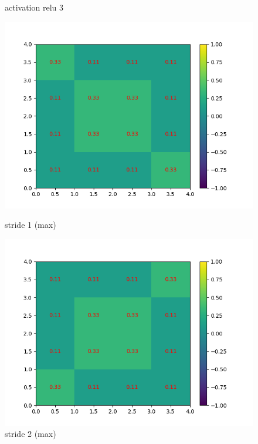 \begin{figure}[h]
        \caption{activation relu 3}
    \endminipage
\end{figure}

\begin{figure}[h]
        \includegraphics[width=\textwidth]{img/cnn_exemple/square/stride_1_max.png}
        \caption{stride 1 (max)}
    \endminipage\hfill
        \includegraphics[width=\textwidth]{img/cnn_exemple/square/stride_2_max.png}
        \caption{stride 2 (max)}
    \endminipage\hfill

\end{figure}
